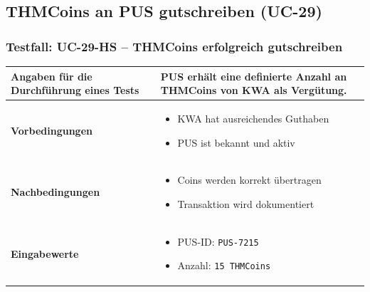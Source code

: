 \documentclass[a4paper,12pt]{article}
\begin{document}
\vspace{1.5cm}



\subsection{THMCoins an PUS gutschreiben (UC-29)}

\subsubsection{Testfall: UC-29-HS – THMCoins erfolgreich gutschreiben}
\vspace{0.5cm}

\renewcommand{\arraystretch}{1.3}
\begin{center}
\begin{tabular}{|p{5cm}|p{10.5cm}|}
\hline
\textbf{Angaben für die Durchführung eines Tests} & 
PUS erhält eine definierte Anzahl an THMCoins von KWA als Vergütung. \\
\hline
\textbf{Vorbedingungen} &
\begin{minipage}[t]{10.5cm}
\begin{itemize}[leftmargin=*]
  \item KWA hat ausreichendes Guthaben
  \item PUS ist bekannt und aktiv
\end{itemize}
\vspace{0.2cm}
\end{minipage} \\
\hline
\textbf{Nachbedingungen} &
\begin{minipage}[t]{10.5cm}
\begin{itemize}[leftmargin=*]
  \item Coins werden korrekt übertragen
  \item Transaktion wird dokumentiert
\end{itemize}
\vspace{0.2cm}
\end{minipage} \\
\hline
\textbf{Eingabewerte} &
\begin{minipage}[t]{10.5cm}
\begin{itemize}[leftmargin=*]
  \item PUS-ID: \texttt{PUS-7215}
  \item Anzahl: \texttt{15 THMCoins}
\end{itemize}
\vspace{0.2cm}
\end{minipage} \\

\end{tabular}
\end{center}
\end{document}
